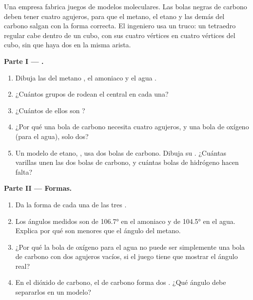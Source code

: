 \begin{problem}
\label{pb:g10:lewis-and-shape:1}
Una empresa fabrica juegos de modelos moleculares. Las bolas negras de
carbono deben tener cuatro agujeros, para que el metano, el etano y las
demás  del carbono salgan con la forma correcta. El ingeniero
usa un truco: un tetraedro regular cabe dentro de un cubo, con sus
cuatro vértices en cuatro vértices del cubo, sin que haya dos en la misma
arista.

\medskip
\noindent\textbf{Parte I --- .}
\begin{enumerate}
  \item Dibuja las  del metano , el amoniaco
         y el agua .
  \item ¿Cuántos grupos de  rodean el  central en cada
        una?
  \item ¿Cuántos de ellos son ?
  \item ¿Por qué una bola de carbono necesita cuatro agujeros, y una bola
        de oxígeno (para el agua), solo dos?
  \item Un modelo de etano, , usa dos bolas de carbono. Dibuja
        su . ¿Cuántas varillas unen las dos bolas de
        carbono, y cuántas bolas de hidrógeno hacen falta?
\end{enumerate}

\medskip
\noindent\textbf{Parte II --- Formas.}
\begin{enumerate}[resume]
  \item Da la forma de cada una de las tres .
  \item Los ángulos medidos son de \ang{106.7} en el amoniaco y de
        \ang{104.5} en el agua. Explica por qué son menores que el
        ángulo del metano.
  \item ¿Por qué la bola de oxígeno para el agua no puede ser
        simplemente una bola de carbono con dos agujeros vacíos, si el
        juego tiene que mostrar el ángulo real?
  \item En el dióxido de carbono, el  de carbono forma dos . ¿Qué ángulo debe separarlos en un modelo?
\end{enumerate}


\end{problem}
